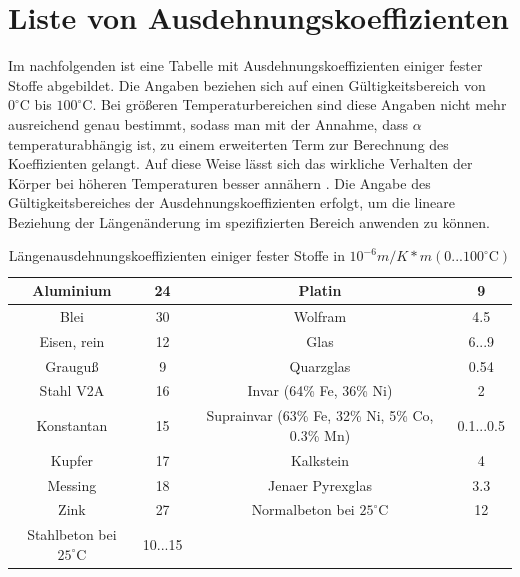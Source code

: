 \section{Liste von Ausdehnungskoeffizienten}\label{sec:ListevonAusdehnungskoeffizienten}

Im nachfolgenden ist eine Tabelle mit Ausdehnungskoeffizienten einiger fester Stoffe abgebildet. Die Angaben beziehen sich auf einen Gültigkeitsbereich von $0^\circ\text{C}$ bis $100^\circ\text{C}$. Bei größeren Temperaturbereichen sind diese Angaben nicht mehr ausreichend genau bestimmt, sodass man mit der Annahme, dass $\alpha$ temperaturabhängig ist, zu einem erweiterten Term zur Berechnung des Koeffizienten gelangt. Auf diese Weise lässt sich das wirkliche Verhalten der Körper bei höheren Temperaturen besser annähern \cite{Lindner2006}. Die Angabe des Gültigkeitsbereiches der Ausdehnungskoeffizienten erfolgt, um die lineare Beziehung der Längenänderung im spezifizierten Bereich anwenden zu können.
\begin{table}[h]
	\centering
	\caption[Längenausdehnungskoeffizienten]{Längenausdehnungskoeffizienten einiger fester Stoffe in $10^{-6}m/K*m(0...100^\circ\text{C})$\protect\footnotemark}
	\begin{tabular}{|c|c||c|c|}
		\hline
		Aluminium & 24 & Platin & 9 \\
		\hline
		Blei & 30 & Wolfram & 4.5 \\
		\hline
		Eisen, rein & 12 & Glas & 6...9 \\
		\hline
		Grauguß & 9 & Quarzglas & 0.54 \\
		\hline
		Stahl V2A & 16 & Invar (64\% Fe, 36\% Ni) & 2 \\
		\hline
		Konstantan & 15 & Suprainvar (63\% Fe, 32\% Ni, 5\% Co, 0.3\% Mn) & 0.1...0.5 \\
		\hline
		Kupfer & 17 & Kalkstein & 4 \\
		\hline
		Messing & 18 & Jenaer Pyrexglas & 3.3 \\
		\hline
		Zink & 27 & Normalbeton bei $25^\circ\text{C}$\protect\footnotemark & 12 \\
		\hline
		Stahlbeton bei $25^\circ\text{C}$\footref{ftn:stoecker} & 10...15 & & \\
		\hline
	\end{tabular}
\label{tab:ausdehnungskoeffizienten}
\vspace{-1cm}
\end{table}
\addtocounter{footnote}{-1}
\newpage

